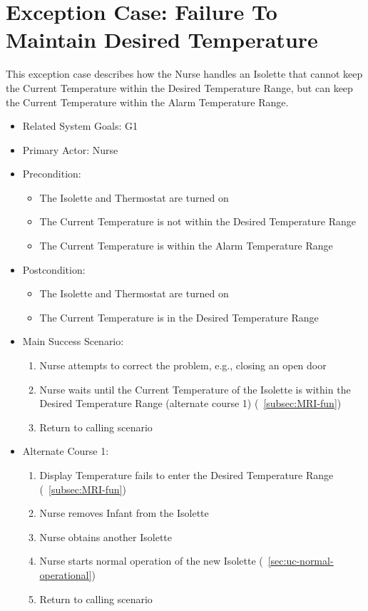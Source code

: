 \section{Exception Case: Failure To Maintain Desired Temperature}
\label{sec:ec-failure-maintain-temperature}

This exception case describes how the Nurse handles an Isolette that cannot keep the Current
Temperature within the Desired Temperature Range, but can keep the Current Temperature
within the Alarm Temperature Range.

\begin{itemize}
\item Related System Goals: G1
\item Primary Actor: Nurse
\item Precondition:
  \begin{itemize}
  \item The Isolette and Thermostat are turned on
  \item The Current Temperature is not within the Desired Temperature Range
  \item The Current Temperature is within the Alarm Temperature Range
  \end{itemize}
\item Postcondition:
  \begin{itemize}
  \item The Isolette and Thermostat are turned on
  \item The Current Temperature is in the Desired Temperature Range
  \end{itemize}
\item Main Success Scenario:
  \begin{enumerate}
  \item Nurse attempts to correct the problem, e.g., closing an open door
  \item Nurse waits until the Current Temperature of the Isolette is within the Desired
        Temperature Range (alternate course 1) (~\ref{subsec:MRI-fun})
  \item Return to calling scenario
  \end{enumerate}
\item Alternate Course 1:
  \begin{enumerate}
  \item Display Temperature fails to enter the Desired Temperature Range (~\ref{subsec:MRI-fun})
  \item Nurse removes Infant from the Isolette
  \item Nurse obtains another Isolette
  \item Nurse starts normal operation of the new Isolette (~\ref{sec:uc-normal-operational})
  \item Return to calling scenario
  \end{enumerate}
\end{itemize}
